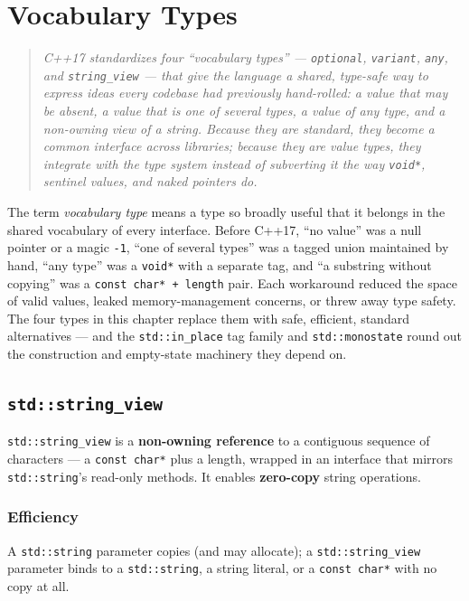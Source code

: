 \chapter{Vocabulary Types}
\label{ch:c17-vocabulary-types}

\begin{quote}
\emph{C++17 standardizes four ``vocabulary types'' --- \texttt{optional}, \texttt{variant}, \texttt{any}, and \texttt{string\_view} --- that give the language a shared, type-safe way to express ideas every codebase had previously hand-rolled: a value that may be absent, a value that is one of several types, a value of any type, and a non-owning view of a string. Because they are standard, they become a common interface across libraries; because they are value types, they integrate with the type system instead of subverting it the way \texttt{void*}, sentinel values, and naked pointers do.}
\end{quote}

The term \emph{vocabulary type} means a type so broadly useful that it belongs in the shared vocabulary of every interface. Before C++17, ``no value'' was a null pointer or a magic \texttt{-1}, ``one of several types'' was a tagged union maintained by hand, ``any type'' was a \texttt{void*} with a separate tag, and ``a substring without copying'' was a \texttt{const char* + length} pair. Each workaround reduced the space of valid values, leaked memory-management concerns, or threw away type safety. The four types in this chapter replace them with safe, efficient, standard alternatives --- and the \texttt{std::in\_place} tag family and \texttt{std::monostate} round out the construction and empty-state machinery they depend on.

\section{\texttt{std::string\_view}}
\label{sec:c17-string-view}

\texttt{std::string\_view} is a \textbf{non-owning reference} to a contiguous sequence of characters --- a \texttt{const char*} plus a length, wrapped in an interface that mirrors \texttt{std::string}'s read-only methods. It enables \textbf{zero-copy} string operations.

\subsection{Efficiency}

A \texttt{std::string} parameter copies (and may allocate); a \texttt{std::string\_view} parameter binds to a \texttt{std::string}, a string literal, or a \texttt{const char*} with no copy at all.

